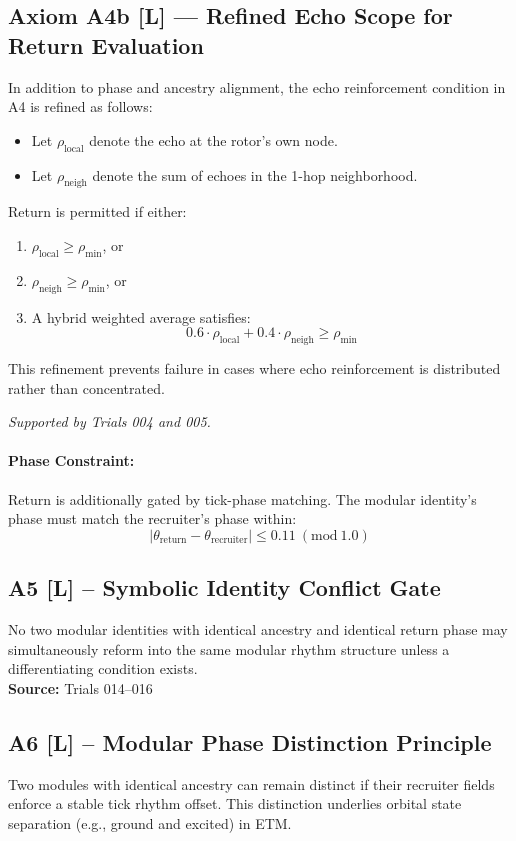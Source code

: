 \documentclass[12pt]{article}
\begin{document}
\subsection*{Axiom A4b [L] — Refined Echo Scope for Return Evaluation}
In addition to phase and ancestry alignment, the echo reinforcement condition in A4 is refined as follows:
\begin{itemize}
  \item Let $\rho_{\text{local}}$ denote the echo at the rotor’s own node.
  \item Let $\rho_{\text{neigh}}$ denote the sum of echoes in the 1-hop neighborhood.
\end{itemize}

Return is permitted if either:
\begin{enumerate}
  \item $\rho_{\text{local}} \ge \rho_{\text{min}}$, or
  \item $\rho_{\text{neigh}} \ge \rho_{\text{min}}$, or
  \item A hybrid weighted average satisfies:
  \[
  0.6 \cdot \rho_{\text{local}} + 0.4 \cdot \rho_{\text{neigh}} \ge \rho_{\text{min}}
  \]
\end{enumerate}

This refinement prevents failure in cases where echo reinforcement is distributed rather than concentrated.

\textit{Supported by Trials 004 and 005.}

\paragraph{Phase Constraint:} Return is additionally gated by tick-phase matching. The modular identity’s phase must match the recruiter’s phase within:
\[
|\theta_{\text{return}} - \theta_{\text{recruiter}}| \leq 0.11 \ (\text{mod} \ 1.0)
\]

\subsection*{A5 [L] – Symbolic Identity Conflict Gate}
No two modular identities with identical ancestry and identical return phase may simultaneously reform into the same modular rhythm structure unless a differentiating condition exists.\\
\textbf{Source:} Trials 014–016

\subsection*{A6 [L] – Modular Phase Distinction Principle}
Two modules with identical ancestry can remain distinct if their recruiter fields enforce a stable tick rhythm offset. This distinction underlies orbital state separation (e.g., ground and excited) in ETM.
\end{document}
